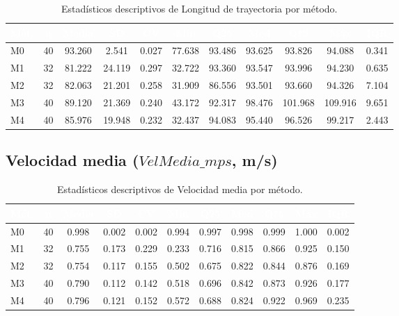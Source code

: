 \documentclass[12pt,a4paper,oneside]{book}
\begin{document}
\begin{table}[H]
\centering
\caption{Estadísticos descriptivos de Longitud de trayectoria por método.}
\renewcommand{\arraystretch}{1.25}
\small
\begin{tabular}{lcccccccccc}
\toprule
\rowcolor{primary}
\textcolor{white}{\textbf{Mét.}} & \textcolor{white}{\textbf{n}} & \textcolor{white}{\textbf{Media}} & \textcolor{white}{\textbf{SD}} & \textcolor{white}{\textbf{CV}} & \textcolor{white}{\textbf{Mín}} & \textcolor{white}{\textbf{Q25}} & \textcolor{white}{\textbf{Med}} & \textcolor{white}{\textbf{Q75}} & \textcolor{white}{\textbf{Máx}} & \textcolor{white}{\textbf{IQR}} \\
\midrule
M0 & 40 & 93.260 & 2.541 & 0.027 & 77.638 & 93.486 & 93.625 & 93.826 & 94.088 & 0.341 \\
M1 & 32 & 81.222 & 24.119 & 0.297 & 32.722 & 93.360 & 93.547 & 93.996 & 94.230 & 0.635 \\
M2 & 32 & 82.063 & 21.201 & 0.258 & 31.909 & 86.556 & 93.501 & 93.660 & 94.326 & 7.104 \\
M3 & 40 & 89.120 & 21.369 & 0.240 & 43.172 & 92.317 & 98.476 & 101.968 & 109.916 & 9.651 \\
M4 & 40 & 85.976 & 19.948 & 0.232 & 32.437 & 94.083 & 95.440 & 96.526 & 99.217 & 2.443 \\
\bottomrule
\end{tabular}
\end{table}

\subsection{Velocidad media ($\textit{VelMedia\_mps}$, m/s)}

\begin{table}[H]
\centering
\caption{Estadísticos descriptivos de Velocidad media por método.}
\renewcommand{\arraystretch}{1.25}
\small
\begin{tabular}{lcccccccccc}
\toprule
\rowcolor{primary}
\textcolor{white}{\textbf{Mét.}} & \textcolor{white}{\textbf{n}} & \textcolor{white}{\textbf{Media}} & \textcolor{white}{\textbf{SD}} & \textcolor{white}{\textbf{CV}} & \textcolor{white}{\textbf{Mín}} & \textcolor{white}{\textbf{Q25}} & \textcolor{white}{\textbf{Med}} & \textcolor{white}{\textbf{Q75}} & \textcolor{white}{\textbf{Máx}} & \textcolor{white}{\textbf{IQR}} \\
\midrule
M0 & 40 & 0.998 & 0.002 & 0.002 & 0.994 & 0.997 & 0.998 & 0.999 & 1.000 & 0.002 \\
M1 & 32 & 0.755 & 0.173 & 0.229 & 0.233 & 0.716 & 0.815 & 0.866 & 0.925 & 0.150 \\
M2 & 32 & 0.754 & 0.117 & 0.155 & 0.502 & 0.675 & 0.822 & 0.844 & 0.876 & 0.169 \\
M3 & 40 & 0.790 & 0.112 & 0.142 & 0.518 & 0.696 & 0.842 & 0.873 & 0.926 & 0.177 \\
M4 & 40 & 0.796 & 0.121 & 0.152 & 0.572 & 0.688 & 0.824 & 0.922 & 0.969 & 0.235 \\
\bottomrule
\end{tabular}
\end{table}
\end{document}

